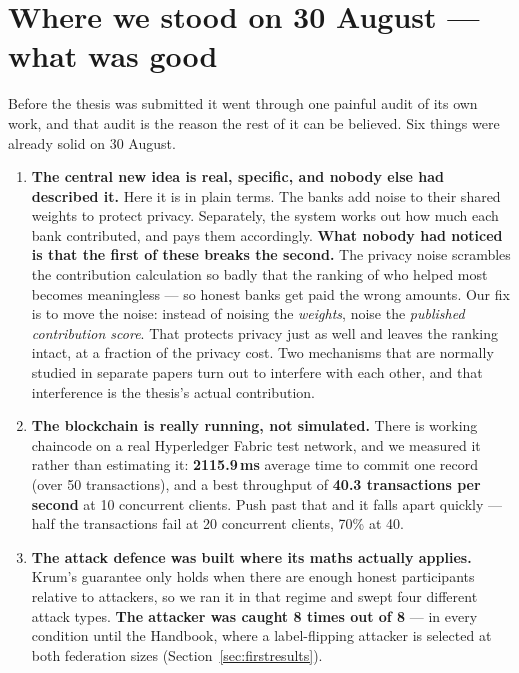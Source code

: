 \documentclass[11pt]{article}
\begin{document}
\section{Where we stood on 30 August --- what was good}

Before the thesis was submitted it went through one painful audit of its own work, and that audit is
the reason the rest of it can be believed. Six things were already solid on 30 August.

\begin{enumerate}[label=\textbf{G\arabic*.}]
  \item \textbf{The central new idea is real, specific, and nobody else had described it.} Here it is in
  plain terms. The banks add noise to their shared weights to protect privacy. Separately, the system
  works out how much each bank contributed, and pays them accordingly. \textbf{What nobody had noticed
  is that the first of these breaks the second.} The privacy noise scrambles the contribution
  calculation so badly that the ranking of who helped most becomes meaningless --- so honest banks get
  paid the wrong amounts. Our fix is to move the noise: instead of noising the \emph{weights}, noise the
  \emph{published contribution score}. That protects privacy just as well and leaves the ranking intact,
  at a fraction of the privacy cost. Two mechanisms that are normally studied in separate papers turn
  out to interfere with each other, and that interference is the thesis's actual contribution.

  \item \textbf{The blockchain is really running, not simulated.} There is working chaincode on a real
  Hyperledger Fabric test network, and we measured it rather than estimating it: \textbf{2115.9\,ms}
  average time to commit one record (over 50 transactions), and a best throughput of \textbf{40.3
  transactions per second} at 10 concurrent clients. Push past that and it falls apart quickly --- half
  the transactions fail at 20 concurrent clients, 70\% at 40.

  \item \textbf{The attack defence was built where its maths actually applies.} Krum's guarantee only
  holds when there are enough honest participants relative to attackers, so we ran it in that regime
  and swept four different attack types. \textbf{The attacker was caught 8 times out of 8} --- in every
  condition until the Handbook, where a label-flipping attacker is selected at both federation sizes
  (Section~\ref{sec:firstresults}).


\end{enumerate}
\end{document}
